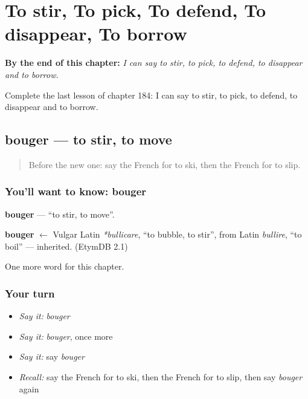 
\chapter{To stir, To pick, To defend, To disappear, To borrow}
\label{ch:fr-to-stir-to-pick-to-defend-to-disappear-to-borrow}

\begin{chapteropening}
\textbf{By the end of this chapter:} \emph{I can say to stir, to pick, to defend, to disappear and to borrow.}

Complete the last lesson of chapter 184: I can say to stir, to pick, to defend, to disappear and to borrow.
\end{chapteropening}

\section[bouger]{bouger — to stir, to move}

\label{lesson:FR-C184-bouger}



\begin{quote}
Before the new one: say the French for to ski, then the French for to slip.
\end{quote}

\subsection*{You'll want to know: bouger}
\textbf{bouger} — \textquotedblleft{}to stir, to move\textquotedblright{}.

\begin{cousinweb}
\textbf{bouger} $\leftarrow$ Vulgar Latin \emph{*bullicare}, \textquotedblleft{}to bubble, to stir\textquotedblright{}, from Latin \emph{bullire}, \textquotedblleft{}to boil\textquotedblright{} — inherited. (EtymDB 2.1)
\end{cousinweb}

\begin{grammarlens}[title={What you've built}]
One more word for this chapter.
\end{grammarlens}

\subsection*{Your turn}
\begin{itemize}
\raggedright
  \item \emph{Say it:} \emph{bouger}
  \item \emph{Say it:} \emph{bouger}, once more
  \item \emph{Say it:} say \emph{bouger}
  \item \emph{Recall:} say the French for to ski, then the French for to slip, then say \emph{bouger} again
\end{itemize}

